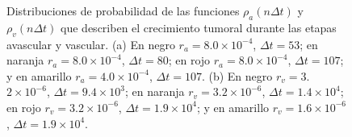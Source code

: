 \begin{figure}[!ht]
\begin{center}
\end{center}\vspace*{-0.5cm}
\caption[Distribuciones de probabilidad de las funciones $\rho_a(n\Delta t)$ y $\rho_v(n\Delta t)$ que describen el crecimiento tumoral para distintos par\'ametros]{Distribuciones de probabilidad de las funciones $\rho_a(n\Delta t)$ y $\rho_v(n\Delta t)$ que describen el crecimiento tumoral durante las etapas avascular y vascular. (a) En negro $r_a=8$.$0 \times 10^{-4}$, $\Delta t = 53$; en naranja $r_a=8$.$0 \times 10^{-4}$, $\Delta t = 80$; en rojo $r_a=8$.$0 \times 10^{-4}$, $\Delta t = 107$; y en amarillo $r_a=4$.$0 \times 10^{-4}$, $\Delta t = 107$. (b) En negro $r_v=3$.$2 \times 10^{-6}$, $\Delta t = 9$.$4 \times 10^{3}$; en naranja $r_v=3$.$2 \times 10^{-6}$, $\Delta t = 1$.$4 \times 10^{4}$; en rojo $r_v=3$.$2 \times 10^{-6}$, $\Delta t = 1$.$9 \times 10^{4}$; y en amarillo $r_v=1$.$6 \times 10^{-6}$, $\Delta t = 1$.$9 \times 10^{4}$.}
\label{graph-probability-distribution-avascular}
\end{figure}

